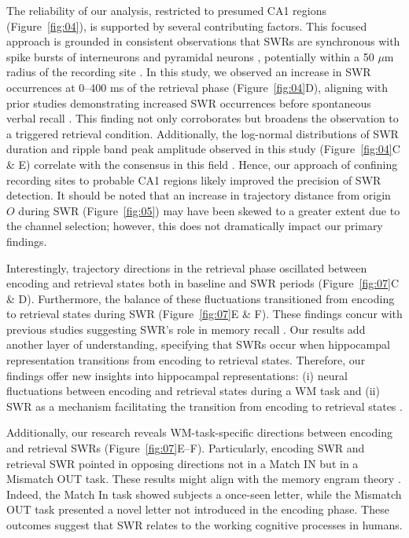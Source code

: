 \documentclass[final,3p,times,twocolumn]{elsarticle}
\newcommand{\REDSTARTS}{\color{red}}
\newcommand{\GREENENDS}{\color{black}}
\begin{document}
\begin{abstract\GREENENDS \REDSTARTS ll_Tables}
The reliability of our analysis, restricted to presumed CA1 regions (Figure~\ref{fig:04}), is supported by several contributing factors. This focused approach is grounded in consistent observations that SWRs are synchronous with spike bursts of interneurons and pyramidal neurons \cite{buzsaki_two-stage_1989} \cite{quyen_cell_2008} \cite{royer_control_2012} \cite{hajos_input-output_2013}, potentially within a 50 $\mu$m radius of the recording site \cite{schomburg_spiking_2012}. In this study, we observed an increase in SWR occurrences at 0--400 ms of the retrieval phase (Figure~\ref{fig:04}D), aligning with prior studies demonstrating increased SWR occurrences before spontaneous verbal recall \cite{norman_hippocampal_2019} \cite{norman_hippocampal_2021}. This finding not only corroborates but broadens the observation to a triggered retrieval condition. Additionally, the log-normal distributions of SWR duration and ripple band peak amplitude observed in this study (Figure~\ref{fig:04}C & E) correlate with the consensus in this field \cite{liu_consensus_2022}. Hence, our approach of confining recording sites to probable CA1 regions likely improved the precision of SWR detection. It should be noted that an increase in trajectory distance from origin $O$ during SWR (Figure~\ref{fig:05}) may have been skewed to a greater extent due to the channel selection; however, this does not dramatically impact our primary findings.

Interestingly, trajectory directions in the retrieval phase oscillated between encoding and retrieval states both in baseline and SWR periods (Figure~\ref{fig:07}C \& D). Furthermore, the balance of these fluctuations transitioned from encoding to retrieval states during SWR (Figure~\ref{fig:07}E \& F). These findings concur with previous studies suggesting SWR's role in memory recall \cite{norman_hippocampal_2019} \cite{norman_hippocampal_2021}. Our results add another layer of understanding, specifying that SWRs occur when hippocampal representation transitions from encoding to retrieval states. Therefore, our findings offer new insights into hippocampal representations: (i) neural fluctuations between encoding and retrieval states during a WM task and (ii) SWR as a mechanism facilitating the transition from encoding to retrieval states \cite{buzsaki_hippocampal_2015}.

Additionally, our research reveals WM-task-specific directions between encoding and retrieval SWRs (Figure~\ref{fig:07}E--F). Particularly, encoding SWR and retrieval SWR pointed in opposing directions not in a Match IN but in a Mismatch OUT task. These results might align with the memory engram theory \cite{liu_optogenetic_2012}. Indeed, the Match In task showed subjects a once-seen letter, while the Mismatch OUT task presented a novel letter not introduced in the encoding phase. These outcomes suggest that SWR relates to the working cognitive processes in humans.


\end{abstract\GREENENDS \REDSTARTS ll_Tables}
\end{document}
